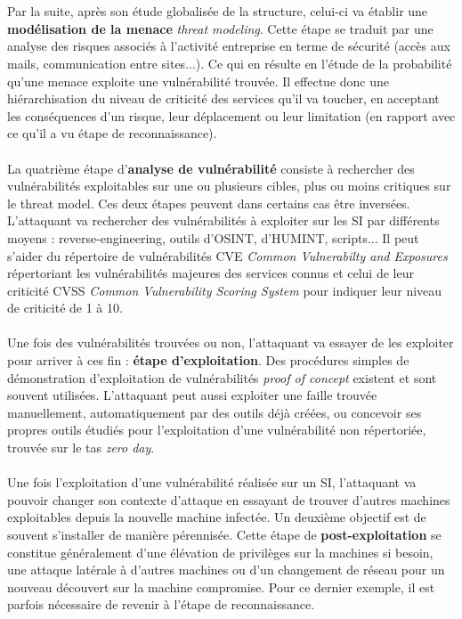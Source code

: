 \\ \\
Par la suite, après son étude globalisée de la structure, celui-ci va établir une \textbf{modélisation de la menace} \textit{threat modeling}. Cette étape se traduit par une analyse des risques associés à l'activité entreprise en terme de sécurité (accès aux mails, communication entre sites...). Ce qui en résulte en l'étude de la probabilité qu'une menace exploite une vulnérabilité trouvée. Il effectue donc une hiérarchisation du niveau de criticité des services qu'il va toucher, en acceptant les conséquences d'un risque, leur déplacement ou leur limitation (en rapport avec ce qu'il a vu étape de reconnaissance).
\\ \\
La quatrième étape d'\textbf{analyse de vulnérabilité} consiste à rechercher des vulnérabilités exploitables sur une ou plusieurs cibles, plus ou moins critiques sur le threat model. Ces deux étapes peuvent dans certains cas être inversées. L'attaquant va rechercher des vulnérabilités à exploiter sur les SI par différents moyens : reverse-engineering, outils d'OSINT, d'HUMINT, scripts... Il peut s'aider du répertoire de vulnérabilités CVE \textit{Common Vulnerabilty and Exposures} répertoriant les vulnérabilités majeures des services connus et celui de leur criticité CVSS \textit{Common Vulnerability Scoring System} pour indiquer leur niveau de criticité de 1 à 10.
\\ \\
Une fois des vulnérabilités trouvées ou non, l'attaquant va essayer de les exploiter pour arriver à ces fin : \textbf{étape d'exploitation}. Des procédures simples de démonstration d'exploitation de vulnérabilités \textit{proof of concept} existent et sont souvent utilisées. L'attaquant peut aussi exploiter une faille trouvée manuellement, automatiquement par des outils déjà créées, ou concevoir ses propres outils étudiés pour l'exploitation d'une vulnérabilité non répertoriée, trouvée sur le tas \textit{zero day}.
\\ \\
Une fois l'exploitation d'une vulnérabilité réalisée sur un SI, l'attaquant va pouvoir changer son contexte d'attaque en essayant de trouver d'autres machines exploitables depuis la nouvelle machine infectée. Un deuxième objectif est de souvent s'installer de manière pérennisée. Cette étape de \textbf{post-exploitation} se constitue généralement d'une élévation de privilèges sur la machines si besoin, une attaque latérale à d'autres machines ou d'un changement de réseau pour un nouveau découvert sur la machine compromise. Pour ce dernier exemple, il est parfois nécessaire de revenir à l'étape de reconnaissance.
